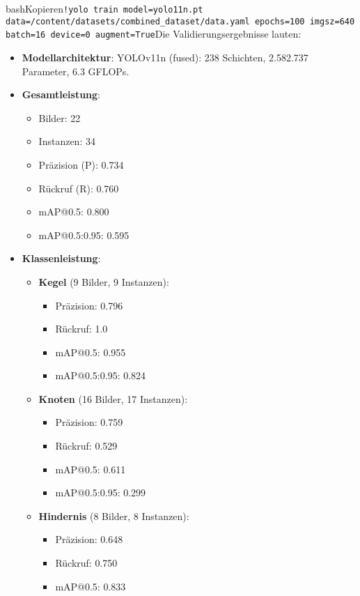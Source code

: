 bashKopieren\verb|!yolo train model=yolo11n.pt data=/content/datasets/combined_dataset/data.yaml epochs=100 imgsz=640 batch=16 device=0 augment=True|Die Validierungsergebnisse lauten:

\begin{itemize} 
    \item \textbf{Modellarchitektur}: YOLOv11n (fused): 238 Schichten, 2.582.737 Parameter, 6.3 GFLOPs. 
    \item \textbf{Gesamtleistung}: 
    \begin{itemize} 
        \item Bilder: 22 
        \item Instanzen: 34 
        \item Präzision (P): 0.734 
        \item Rückruf (R): 0.760 
        \item mAP@0.5: 0.800 
        \item mAP@0.5:0.95: 0.595 
    \end{itemize}  
    \item \textbf{Klassenleistung}: 
    \begin{itemize} 
        \item \textbf{Kegel} (9 Bilder, 9 Instanzen): 
        \begin{itemize} 
            \item Präzision: 0.796 
            \item Rückruf: 1.0 
            \item mAP@0.5: 0.955 
            \item mAP@0.5:0.95: 0.824 
        \end{itemize}  
        \item \textbf{Knoten} (16 Bilder, 17 Instanzen): 
        \begin{itemize} 
            \item Präzision: 0.759 
            \item Rückruf: 0.529 
            \item mAP@0.5: 0.611 
            \item mAP@0.5:0.95: 0.299 
        \end{itemize}  
        \item \textbf{Hindernis} (8 Bilder, 8 Instanzen): 
        \begin{itemize} 
            \item Präzision: 0.648 
            \item Rückruf: 0.750 
            \item mAP@0.5: 0.833 

\end{itemize}
\end{itemize}
\end{itemize}
